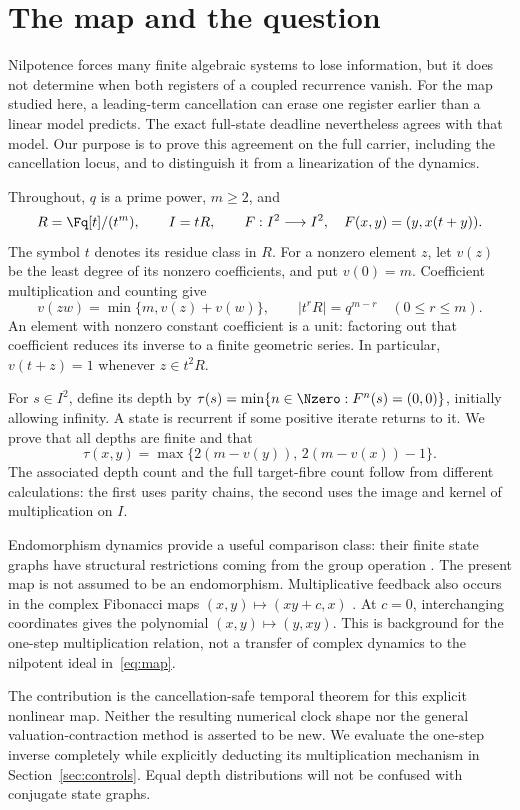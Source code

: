 \section{The map and the question}
\label{sec:setup}

Nilpotence forces many finite algebraic systems to lose information, but it
does not determine when both registers of a coupled recurrence vanish.
For the map studied here, a leading-term cancellation can erase one
register earlier than a linear model predicts. The exact full-state
deadline nevertheless agrees with that model. Our purpose is to prove this
agreement on the full carrier, including the cancellation locus, and to
distinguish it from a linearization of the dynamics.

Throughout, $q$ is a prime power, $m\geq2$, and
\begin{equation}
 R=\Fq[t]/(t^m),\qquad I=tR,\qquad
 F:I^2\longrightarrow I^2,\quad F(x,y)=(y,x(t+y)).
 \label{eq:map}
\end{equation}
The symbol $t$ denotes its residue class in $R$. For a nonzero element
$z$, let $v(z)$ be the least degree of its nonzero coefficients, and put
$v(0)=m$. Coefficient multiplication and counting give
\begin{equation}
 v(zw)=\min\{m,v(z)+v(w)\},\qquad
 |t^rR|=q^{m-r}\quad(0\leq r\leq m).
 \label{eq:ideals}
\end{equation}
An element with nonzero constant coefficient is a unit: factoring out that
coefficient reduces its inverse to a finite geometric series. In particular,
$v(t+z)=1$ whenever $z\in t^2R$.

For $s\in I^2$, define its depth by
$\tau(s)=\min\{n\in\Nzero:F^n(s)=(0,0)\}$, initially allowing infinity.
A state is recurrent if some positive iterate returns to it. We prove that
all depths are finite and that
\begin{equation}
 \tau(x,y)=\max\{2(m-v(y)),\,2(m-v(x))-1\}.
 \label{eq:preview}
\end{equation}
The associated depth count and the full target-fibre count follow from
different calculations: the first uses parity chains, the second uses the
image and kernel of multiplication on $I$.

Endomorphism dynamics provide a useful comparison class: their finite state
graphs have structural restrictions coming from the group operation
\cite{Bors2017}. The present map is not assumed to be an endomorphism.
Multiplicative feedback also occurs in the complex Fibonacci maps
$(x,y)\mapsto(xy+c,x)$ \cite{ElAbdalaouiEtAl2016}. At $c=0$, interchanging
coordinates gives the polynomial $(x,y)\mapsto(y,xy)$. This is background
for the one-step multiplication relation, not a transfer of complex dynamics
to the nilpotent ideal in~\eqref{eq:map}.

The contribution is the cancellation-safe temporal theorem for this
explicit nonlinear map. Neither the resulting numerical clock shape nor
the general valuation-contraction method is asserted to be new. We evaluate
the one-step inverse completely while explicitly deducting its multiplication
mechanism in Section~\ref{sec:controls}. Equal depth distributions will not
be confused with conjugate state graphs.
